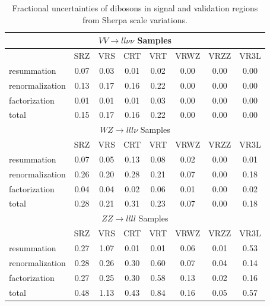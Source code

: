 \begin{table}
	\begin{center}
 		\begin{tabular}{l|c|c|c|c|c|c|c}
		    \hline \hline 
   			\multicolumn{8}{c}{$VV \rightarrow ll\nu\nu$ Samples} \\
  	 		\hline
			&	SRZ & VRS & CRT & VRT & VRWZ & VRZZ & VR3L \\
			\hline
			resummation & 0.07 & 0.03 & 0.01 & 0.02 & 0.00 & 0.00 & 0.00 \\
			renormalization & 0.13 & 0.17 & 0.16 & 0.22 & 0.00 & 0.00 & 0.00 \\
			factorization & 0.01 & 0.01 & 0.01 & 0.03 & 0.00 & 0.00 & 0.00 \\
			total & 0.15 & 0.17 & 0.16 & 0.22 & 0.00 & 0.00 & 0.00 \\
		    \hline 
   			\multicolumn{8}{c}{$WZ \rightarrow lll\nu$ Samples} \\
  	 		\hline
			&	SRZ & VRS & CRT & VRT & VRWZ & VRZZ & VR3L \\
			\hline
			resummation & 0.07 & 0.05 & 0.13 & 0.08 & 0.02 & 0.00 & 0.01 \\
			renormalization & 0.26 & 0.20 & 0.28 & 0.21 & 0.07 & 0.00 & 0.18 \\
			factorization & 0.04 & 0.04 & 0.02 & 0.06 & 0.01 & 0.00 & 0.02 \\
			total & 0.28 & 0.21 & 0.31 & 0.23 & 0.07 & 0.00 & 0.18 \\
  	 		\hline
   			\multicolumn{8}{c}{$ZZ \rightarrow llll$ Samples} \\
  	 		\hline
			&	SRZ & VRS & CRT & VRT & VRWZ & VRZZ & VR3L \\
			\hline
			resummation & 0.27 & 1.07 & 0.01 & 0.01 & 0.06 & 0.01 & 0.53 \\
			renormalization & 0.28 & 0.26 & 0.30 & 0.60 & 0.07 & 0.04 & 0.14 \\
			factorization & 0.27 & 0.25 & 0.30 & 0.58 & 0.13 & 0.02 & 0.16 \\
			total & 0.48 & 1.13 & 0.43 & 0.84 & 0.16 & 0.05 & 0.57 \\
  	 		\hline\hline
 		\end{tabular}
	\end{center}
	\caption{Fractional uncertainties of dibosons in signal and validation regions from Sherpa scale variations.}
	\label{table:Diboson_theoryuncert}
\end{table}

